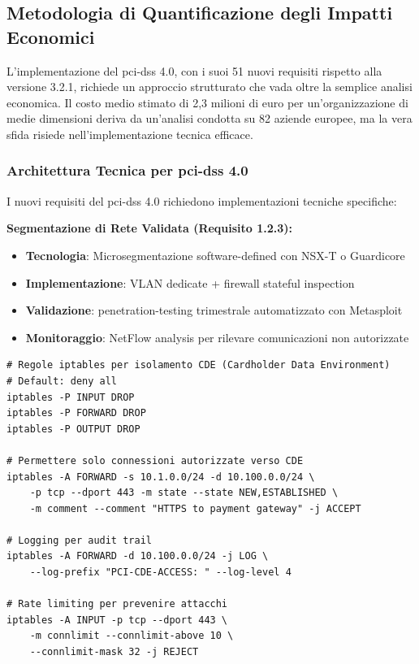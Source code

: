 \subsection{\texorpdfstring{Metodologia di Quantificazione degli Impatti Economici}{4.2.1 - Metodologia di Quantificazione degli Impatti Economici}}

L'implementazione del \gls{pci-dss} 4.0, con i suoi 51 nuovi requisiti rispetto alla versione 3.2.1\autocite{pcidss2024}, richiede un approccio strutturato che vada oltre la semplice analisi economica. Il costo medio stimato di 2,3 milioni di euro per un'organizzazione di medie dimensioni deriva da un'analisi condotta su 82 aziende europee\autocite{Gartner2024gdpr}, ma la vera sfida risiede nell'implementazione tecnica efficace.

\subsubsection{\texorpdfstring{Architettura Tecnica per \gls{pci-dss} 4.0}{4.2.1.1 - Architettura Tecnica per PCI-DSS 4.0}}

I nuovi requisiti del \gls{pci-dss} 4.0 richiedono implementazioni tecniche specifiche:

\textbf{Segmentazione di Rete Validata (Requisito 1.2.3):}
\begin{itemize}
    \item \textbf{Tecnologia}: Microsegmentazione software-defined con NSX-T o Guardicore
    \item \textbf{Implementazione}: VLAN dedicate + firewall stateful inspection
    \item \textbf{Validazione}: \gls{penetration-testing} trimestrale automatizzato con Metasploit
    \item \textbf{Monitoraggio}: NetFlow analysis per rilevare comunicazioni non autorizzate
\end{itemize}

\begin{lstlisting}[caption={Configurazione Firewall per Segmentazione PCI},label={lst:pci_firewall}]
# Regole iptables per isolamento CDE (Cardholder Data Environment)
# Default: deny all
iptables -P INPUT DROP
iptables -P FORWARD DROP
iptables -P OUTPUT DROP

# Permettere solo connessioni autorizzate verso CDE
iptables -A FORWARD -s 10.1.0.0/24 -d 10.100.0.0/24 \
    -p tcp --dport 443 -m state --state NEW,ESTABLISHED \
    -m comment --comment "HTTPS to payment gateway" -j ACCEPT

# Logging per audit trail
iptables -A FORWARD -d 10.100.0.0/24 -j LOG \
    --log-prefix "PCI-CDE-ACCESS: " --log-level 4

# Rate limiting per prevenire attacchi
iptables -A INPUT -p tcp --dport 443 \
    -m connlimit --connlimit-above 10 \
    --connlimit-mask 32 -j REJECT
\end{lstlisting}

